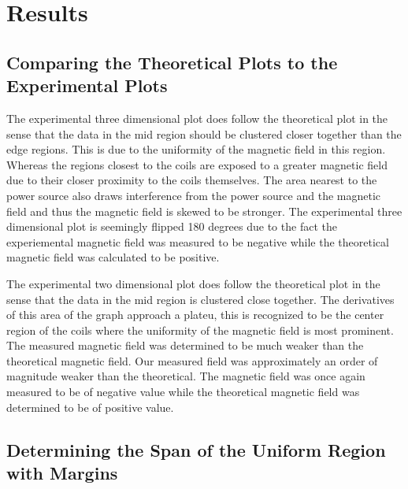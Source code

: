 \documentclass[a4paper]{article}
\begin{document}



\section{Results}
\subsection{Comparing the Theoretical Plots to the Experimental Plots}
The experimental three dimensional plot does follow the theoretical
plot in the sense that the data in the mid region should be clustered
closer together than the edge regions. This is due to the uniformity
of the magnetic field in this region. Whereas the regions closest to
the coils are exposed to a greater magnetic field due to their closer
proximity to the coils themselves. The area nearest to the power
source also draws interference from the power source and the magnetic
field and thus the magnetic field is skewed to be stronger. The
experimental three dimensional plot is seemingly flipped 180 degrees
due to the fact the experiemental magnetic field was measured to be
negative while the theoretical magnetic field was calculated to be
positive.

The experimental two dimensional plot does follow the theoretical plot
in the sense that the data in the mid region is clustered close
together. The derivatives of this area of the graph approach a
plateu, this is recognized to be the center region of the coils where
the uniformity of the magnetic field is most prominent. The measured
magnetic field was determined to be much weaker than the theoretical
magnetic field. Our measured field was approximately an order of
magnitude weaker than the theoretical. The magnetic field was once
again measured to be of negative value while the theoretical magnetic
field was determined to be of positive value.

\subsection{Determining the Span of the Uniform Region with Margins}
\end{document}
